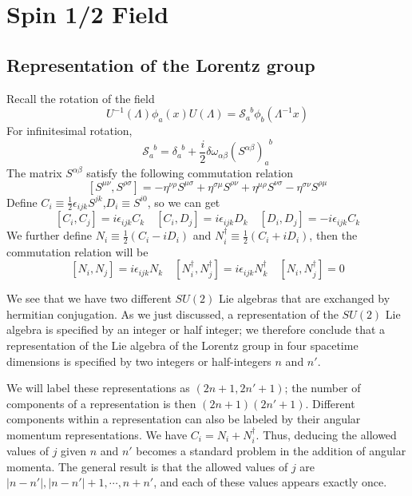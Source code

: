 \documentclass[cyan]{elegantnote}
\author{Yuyang Songsheng}
\begin{document}
\maketitle
\tableofcontents
\chapter{Spin 1/2 Field}
\section{Representation of the Lorentz group}
\noindent
Recall the rotation of the field
\[U^{-1}(\Lambda) \phi_a(x) U(\Lambda) = \mathcal{S}_{a}^{\phantom{a}b}\phi_b(\Lambda^{-1}x)\]
For infinitesimal rotation,
\[\mathcal{S}_{a}^{\phantom{a}b} = \delta_{a}^{\phantom{a}b}+\frac{i}{2} \delta \omega_{\alpha \beta} (S^{\alpha \beta})_{a}^{\phantom{a}b} \]
The matrix $S^{\alpha \beta}$ satisfy the following commutation relation
\[[S^{\mu \nu},S^{\rho \sigma}]= -\eta^{\nu \rho}S^{\mu \sigma} + \eta^{\sigma \mu}S^{\rho \nu} + \eta^{\mu \rho}S^{\nu \sigma} - \eta^{\sigma \nu}S^{\rho \mu}\]
Define $C_i \equiv \frac{1}{2}\epsilon_{ijk}S^{jk}$,$D_i \equiv S^{i0}$, so we can get
\[[C_i,C_j] = i\epsilon_{ijk}C_k \quad [C_i,D_j] = i\epsilon_{ijk}D_k \quad [D_i,D_j] = -i\epsilon_{ijk}C_k\]
We further define $N_i \equiv \frac{1}{2}(C_i-iD_i)$ and $N^{\dagger}_i \equiv \frac{1}{2}(C_i + i D_i)$, then the commutation relation will be
\[[N_i,N_j] = i\epsilon_{ijk}N_k \quad [N^{\dagger}_i,N^{\dagger}_j] = i\epsilon_{ijk}N^{\dagger}_k \quad [N_i,N^{\dagger}_j] = 0\]

We see that we have two different $SU(2)$ Lie algebras that are exchanged by hermitian conjugation. As we just discussed, a representation of the $SU(2)$ Lie algebra is specified by an integer or half integer; we therefore conclude that a representation of the Lie algebra of the Lorentz group in four spacetime dimensions is specified by two integers or half-integers $n$ and $n'$.

We will label these representations as $(2n+1, 2n'+1)$; the number of components of a representation is then $(2n+1)(2n'+1)$. Different components within a representation can also be labeled by their angular momentum representations. We have $C_i = N_i + N^{\dagger}_i$. Thus, deducing the allowed values of $j$ given $n$ and $n'$ becomes a standard problem in the addition of angular momenta. The general result is that the allowed values of $j$ are $|n-n'|,|n-n'|+1,\cdots, n+n'$, and each of these values appears exactly once.
\end{document}
